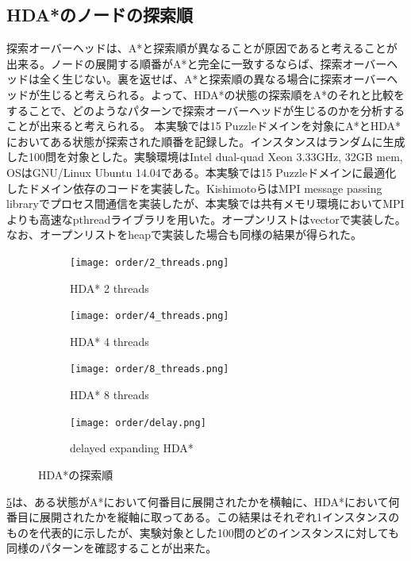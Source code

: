 \documentclass{jsarticle}
\begin{document}
\subsection{HDA*のノードの探索順}

探索オーバーヘッドは、A*と探索順が異なることが原因であると考えることが出来る。ノードの展開する順番がA*と完全に一致するならば、探索オーバーヘッドは全く生じない。裏を返せば、A*と探索順の異なる場合に探索オーバーヘッドが生じると考えられる。よって、HDA*の状態の探索順をA*のそれと比較をすることで、どのようなパターンで探索オーバーヘッドが生じるのかを分析することが出来ると考えられる。
本実験では15 Puzzleドメインを対象にA*とHDA*においてある状態が探索された順番を記録した。インスタンスはランダムに生成した100問を対象とした。実験環境はIntel dual-quad Xeon 3.33GHz, 32GB mem, OSはGNU/Linux Ubuntu 14.04である。本実験では15 Puzzleドメインに最適化したドメイン依存のコードを実装した。KishimotoらはMPI message passing libraryでプロセス間通信を実装したが、本実験では共有メモリ環境においてMPIよりも高速なpthreadライブラリを用いた。オープンリストはvectorで実装した。なお、オープンリストをheapで実装した場合も同様の結果が得られた。


\begin{figure}
	\begin{subfigure}{0.6\columnwidth}
		\centering
		\texttt{[image: order/2\_threads.png]}
		\label{fig:order:2_threads}
		\caption{HDA* 2 threads}
	\end{subfigure}
	\begin{subfigure}{0.6\columnwidth}
		\centering
		\texttt{[image: order/4\_threads.png]}
		\label{fig:order:4_threads}
		\caption{HDA* 4 threads}
	\end{subfigure}
	\begin{subfigure}{0.6\columnwidth}
		\centering
		\texttt{[image: order/8\_threads.png]}
		\label{fig:order:8_t8hreads}
		\caption{HDA* 8 threads}
	\end{subfigure}
	\begin{subfigure}{0.6\columnwidth}
		\centering
		\texttt{[image: order/delay.png]}
		\label{fig:order:delay}
		\caption{delayed expanding HDA*}
	\end{subfigure}
	\label{fig:hdastar_orders}
	\caption{HDA*の探索順}
\end{figure}%


\ref{fig:hdastar_orders}は、ある状態がA*において何番目に展開されたかを横軸に、HDA*において何番目に展開されたかを縦軸に取ってある。この結果はそれぞれ1インスタンスのものを代表的に示したが、実験対象とした100問のどのインスタンスに対しても同様のパターンを確認することが出来た。
\end{document}
